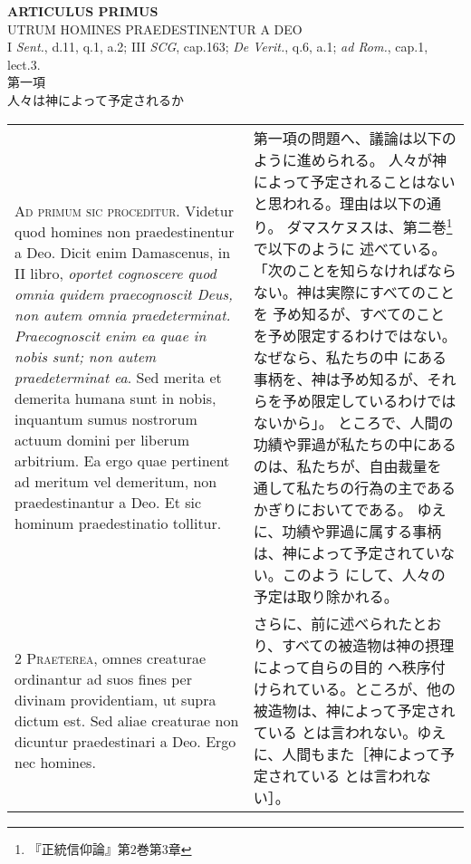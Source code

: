 \documentclass[10pt]{jsarticle} %
\begin{document}
\newpage


\begin{center}
 {\Large {\bf ARTICULUS PRIMUS}}\\
 {\large UTRUM HOMINES PRAEDESTINENTUR A DEO}\\
 {\footnotesize I {\itshape Sent.}, d.11, q.1, a.2; III {\itshape SCG},
 cap.163; {\itshape De Verit.}, q.6, a.1; {\itshape ad Rom.}, cap.1, lect.3.}\\
 {\Large 第一項\\人々は神によって予定されるか}
\end{center}

\begin{longtable}{p{21em}p{21em}}



{\Huge A}{\scshape d primum sic proceditur}. Videtur quod
homines non praedestinentur a Deo. Dicit enim Damascenus, in II libro,
{\itshape oportet cognoscere quod omnia quidem praecognoscit Deus, non autem omnia
praedeterminat. Praecognoscit enim ea quae in nobis sunt; non autem
praedeterminat ea}. Sed merita et demerita humana sunt in nobis,
inquantum sumus nostrorum actuum domini per liberum arbitrium. Ea ergo
quae pertinent ad meritum vel demeritum, non praedestinantur a Deo. Et
sic hominum praedestinatio tollitur.


 
&

 第一項の問題へ、議論は以下のように進められる。
 人々が神によって予定されることはないと思われる。理由は以下の通り。
 ダマスケヌスは、第二巻\footnote{『正統信仰論』第2巻第3章}で以下のように
 述べている。「次のことを知らなければならない。神は実際にすべてのことを
予め知るが、すべてのことを予め限定するわけではない。なぜなら、私たちの中
 にある事柄を、神は予め知るが、それらを予め限定しているわけではないから」。
 ところで、人間の功績や罪過が私たちの中にあるのは、私たちが、自由裁量を
 通して私たちの行為の主であるかぎりにおいてである。
 ゆえに、功績や罪過に属する事柄は、神によって予定されていない。このよう
 にして、人々の予定は取り除かれる。
 

\\


{\scshape 2 Praeterea}, omnes creaturae ordinantur ad
suos fines per divinam providentiam, ut supra dictum est. Sed aliae
creaturae non dicuntur praedestinari a Deo. Ergo nec homines.


 
&

さらに、前に述べられたとおり、すべての被造物は神の摂理によって自らの目的
 へ秩序付けられている。ところが、他の被造物は、神によって予定されている
 とは言われない。ゆえに、人間もまた［神によって予定されている
 とは言われない］。
 


\end{longtable}
\end{document}
